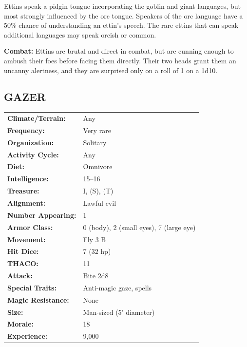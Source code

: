 \begin{multicols}{2}
Ettins speak a pidgin tongue incorporating the goblin and giant languages, but most strongly influenced by the orc tongue. Speakers of the orc language have a 50\% chance of understanding an ettin's speech. The rare ettins that can speak additional languages may speak orcish or common.

\textbf{Combat:} Ettins are brutal and direct in combat, but are cunning enough to ambush their foes before facing them directly. Their two heads grant them an uncanny alertness, and they are surprised only on a roll of 1 on a 1d10.  

\noindent \begin{minipage}{\columnwidth}

\vspace{1em}

\subsection{GAZER}

\noindent \begin{tabular}{p{}p{}}
\textbf{Climate/Terrain:}	& Any \\
\textbf{Frequency:} 		& Very rare \\
\textbf{Organization:} 		& Solitary \\
\textbf{Activity Cycle:} 	& Any \\
\textbf{Diet:} 				& Omnivore \\
\textbf{Intelligence:} 		& 15--16 \\
\textbf{Treasure:} 			& I, (S), (T) \\
\textbf{Alignment:} 		& Lawful evil \\
\hline
\textbf{Number Appearing:} 	& 1 \\
\textbf{Armor Class:} 		& 0 (body), 2 (small eyes), 7 (large eye) \\
\textbf{Movement:} 			& Fly 3 B \\
\textbf{Hit Dice:} 			& 7 (32 hp) \\
\textbf{THACO:} 			& 11 \\
\textbf{Attack:} 			& Bite 2d8 \\
\textbf{Special Traits:} & Anti-magic gaze, spells \\
\textbf{Magic Resistance:} 	& None \\
\textbf{Size:} 				& Man-sized (5' diameter) \\
\textbf{Morale:} 			& 18 \\
\textbf{Experience:} 		& 9,000 \\ %
\end{tabular}


\end{minipage}
\end{multicols}
